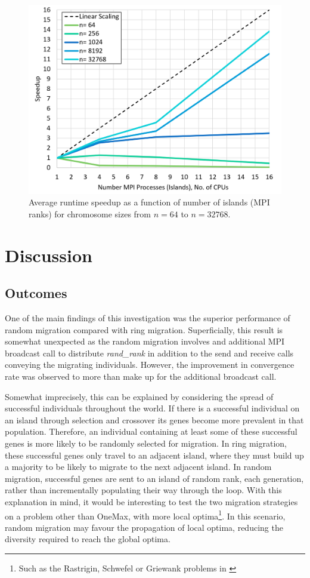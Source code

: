 \documentclass{report}
\begin{document}
\begin{figure}[H]
\centering
\includegraphics[scale=0.385]{speedup}
\caption{Average runtime speedup as a function of number of islands (MPI ranks) for chromosome sizes from \(n=64\) to \(n=32768\).}\label{speedup}
\end{figure}





\section{Discussion}
\subsection{Outcomes}
One of the main findings of this investigation was the superior performance of random migration compared with ring migration. Superficially, this result is somewhat unexpected as the random migration involves and additional  MPI broadcast call to distribute \emph{rand\_rank} in addition to the send and receive calls conveying the migrating individuals. However, the improvement in convergence rate was observed to more than make up for the additional broadcast call.  

Somewhat imprecisely, this can be explained by considering the spread of successful individuals throughout the world. If there is a successful individual on an island through selection and crossover its genes become more prevalent in that population. Therefore, an individual containing at least some of these  successful genes is more likely to be randomly selected for migration. In ring migration, these successful genes only travel to an adjacent island, where they must build up a majority to be likely to migrate to the next adjacent island. In random migration, successful genes are sent to an island of random rank, each generation, rather than incrementally populating their way through the loop. With this explanation in mind, it would be interesting to test the two migration strategies on a problem other than OneMax, with more local optima\footnote{Such as the Rastrigin, Schwefel or Griewank problems in \cite{Luke2013Metaheuristics}}. In this scenario, random migration may favour the propagation of local optima, reducing the diversity required to reach the global optima.
\end{document}
